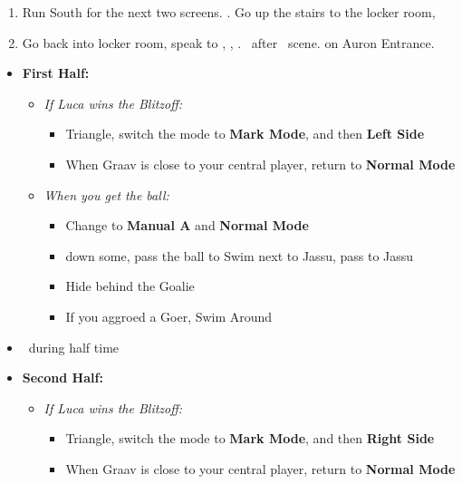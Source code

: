 \begin{enumerate}[resume]
	\item Run South for the next two screens. \save. Go up the stairs to the locker room, \sd
	\item Go back into locker room, speak to \wakka, \sd, \cs[1:20]. \sd\ after \lulu\ scene. \cs[1:40] on Auron Entrance.
\end{enumerate}
\begin{blitzball}
	\begin{itemize}
		\item \textbf{First Half:}
		      \begin{itemize}
			      \item \textit{If Luca wins the Blitzoff:}
			            \begin{itemize}
				            \item Triangle, switch the mode to \textbf{Mark Mode}, and then \textbf{Left Side}
				            \item When Graav is close to your central player, return to \textbf{Normal Mode}
			            \end{itemize}
			      \item \textit{When you get the ball:}
			            \begin{itemize}
				            \item Change to \textbf{Manual A} and \textbf{Normal Mode}
				            \item down some, pass the ball to \tidus
				                  \tidusf Swim next to Jassu, pass to Jassu
				            \item Hide behind the Goalie
				            \item If you aggroed a Goer, Swim Around
			            \end{itemize}
		      \end{itemize}
		\item \sd\ during half time
		\item \textbf{Second Half:}
		      \begin{itemize}
			      \item \textit{If Luca wins the Blitzoff:}
			            \begin{itemize}
				            \item Triangle, switch the mode to \textbf{Mark Mode}, and then \textbf{Right Side}
				            \item When Graav is close to your central player, return to \textbf{Normal Mode}
			            \end{itemize}

\end{itemize}
\end{itemize}
\end{blitzball}

